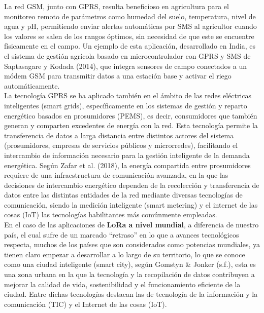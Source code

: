 \documentclass[12pt,a4paper]{article}
\begin{document}
	La red GSM, junto con GPRS, resulta beneficioso en agricultura para el monitoreo remoto de parámetros como humedad del suelo, temperatura, nivel de agua y pH, permitiendo enviar alertas automáticas por SMS al agricultor cuando los valores se salen de los rangos óptimos, sin necesidad de que este se encuentre físicamente en el campo. Un ejemplo de esta aplicación, desarrollado en India, es el sistema de gestión agrícola basado en microcontrolador con GPRS y SMS de Saptasagare y Kodada (2014), que integra sensores de campo conectados a un módem GSM para transmitir datos a una estación base y activar el riego automáticamente. \\
	
	La tecnología GPRS se ha aplicado también en el ámbito de las redes eléctricas inteligentes (smart grids), específicamente en los sistemas de gestión y reparto energético basados en prosumidores (PEMS), es decir, consumidores que también generan y comparten excedentes de energía con la red. Esta tecnología permite la transferencia de datos a larga distancia entre distintos actores del sistema (prosumidores, empresas de servicios públicos y microrredes), facilitando el intercambio de información necesario para la gestión inteligente de la demanda energética. Según Zafar et al. (2018), la energía compartida entre prosumidores requiere de una infraestructura de comunicación avanzada, en la que las decisiones de intercambio energético dependen de la recolección y transferencia de datos entre las distintas entidades de la red mediante diversas tecnologías de comunicación, siendo la medición inteligente (smart metering) y el internet de las cosas (IoT) las tecnologías habilitantes más comúnmente empleadas. \\
	
	En el caso de las aplicaciones de \textbf{LoRa a nivel mundial}, a diferencia de nuestro país, el cual sufre de un marcado “retraso” en lo que a avances tecnológicos respecta, muchos de los países que son considerados como potencias mundiales, ya tienen claro empezar a desarrollar a lo largo de su territorio, lo que se conoce como una ciudad inteligente (smart city), según Gomstyn \& Jonker (s.f.), esta es una zona urbana en la que la tecnología y la recopilación de datos contribuyen a mejorar la calidad de vida, sostenibilidad y el funcionamiento eficiente de la ciudad. Entre dichas tecnologías destacan las de tecnología de la información y la comunicación (TIC) y el Internet de las cosas (IoT).\\
\end{document}
